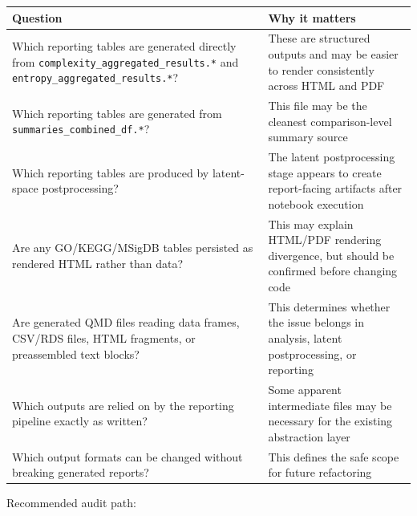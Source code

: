 \documentclass[
  letterpaper,
  DIV=11,
  numbers=noendperiod,
  openany,
  oneside]{scrreprt}
\begin{document}
\begin{longtable}[]{@{}
  >{\raggedright\arraybackslash}p{}
  >{\raggedright\arraybackslash}p{}@{}}
\toprule\noalign{}
\begin{minipage}[b]{\linewidth}\raggedright
Question
\end{minipage} & \begin{minipage}[b]{\linewidth}\raggedright
Why it matters
\end{minipage} \\
\midrule\noalign{}
\endhead
\bottomrule\noalign{}
\endlastfoot
Which reporting tables are generated directly from
\texttt{complexity\_aggregated\_results.*} and
\texttt{entropy\_aggregated\_results.*}? & These are structured outputs
and may be easier to render consistently across HTML and PDF \\
Which reporting tables are generated from
\texttt{summaries\_combined\_df.*}? & This file may be the cleanest
comparison-level summary source \\
Which reporting tables are produced by latent-space postprocessing? &
The latent postprocessing stage appears to create report-facing
artifacts after notebook execution \\
Are any GO/KEGG/MSigDB tables persisted as rendered HTML rather than
data? & This may explain HTML/PDF rendering divergence, but should be
confirmed before changing code \\
Are generated QMD files reading data frames, CSV/RDS files, HTML
fragments, or preassembled text blocks? & This determines whether the
issue belongs in analysis, latent postprocessing, or reporting \\
Which outputs are relied on by the reporting pipeline exactly as
written? & Some apparent intermediate files may be necessary for the
existing abstraction layer \\
Which output formats can be changed without breaking generated reports?
& This defines the safe scope for future refactoring \\
\end{longtable}

Recommended audit path:
\end{document}
